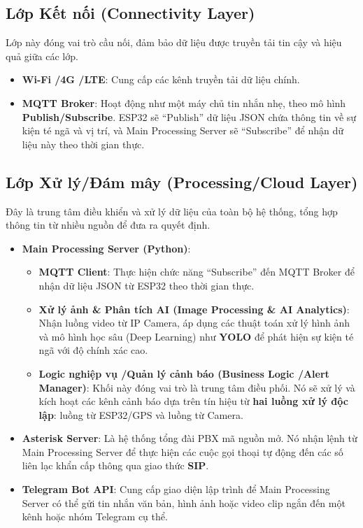 \subsection{Lớp Kết nối (Connectivity Layer)}
Lớp này đóng vai trò cầu nối, đảm bảo dữ liệu được truyền tải tin cậy và hiệu quả giữa các lớp.
\begin{itemize}
    \item \textbf{Wi-Fi \slash 4G \slash LTE}: Cung cấp các kênh truyền tải dữ liệu chính.
    \item \textbf{MQTT Broker}: Hoạt động như một máy chủ tin nhắn nhẹ, theo mô hình \textbf{Publish\slash Subscribe}. ESP32 sẽ ``Publish'' dữ liệu JSON chứa thông tin về sự kiện té ngã và vị trí, và Main Processing Server sẽ ``Subscribe'' để nhận dữ liệu này theo thời gian thực.
\end{itemize}

\subsection{Lớp Xử lý\slash Đám mây (Processing\slash Cloud Layer)}
Đây là trung tâm điều khiển và xử lý dữ liệu của toàn bộ hệ thống, tổng hợp thông tin từ nhiều nguồn để đưa ra quyết định.
\begin{itemize}
    \item \textbf{Main Processing Server (Python)}:
    \begin{itemize}
        \item \textbf{MQTT Client}: Thực hiện chức năng ``Subscribe'' đến MQTT Broker để nhận dữ liệu JSON từ ESP32 theo thời gian thực.
        \item \textbf{Xử lý ảnh \& Phân tích AI (Image Processing \& AI Analytics)}: Nhận luồng video từ IP Camera, áp dụng các thuật toán xử lý hình ảnh và mô hình học sâu (Deep Learning) như \textbf{YOLO} để phát hiện sự kiện té ngã với độ chính xác cao.
        \item \textbf{Logic nghiệp vụ \slash Quản lý cảnh báo (Business Logic \slash Alert Manager)}: Khối này đóng vai trò là trung tâm điều phối. Nó sẽ xử lý và kích hoạt các kênh cảnh báo dựa trên tín hiệu từ \textbf{hai luồng xử lý độc lập}: luồng từ ESP32\slash GPS và luồng từ Camera.
    \end{itemize}
    \item \textbf{Asterisk Server}: Là hệ thống tổng đài PBX mã nguồn mở. Nó nhận lệnh từ Main Processing Server để thực hiện các cuộc gọi thoại tự động đến các số liên lạc khẩn cấp thông qua giao thức \textbf{SIP}.
    \item \textbf{Telegram Bot API}: Cung cấp giao diện lập trình để Main Processing Server có thể gửi tin nhắn văn bản, hình ảnh hoặc video clip ngắn đến một kênh hoặc nhóm Telegram cụ thể.
\end{itemize}

